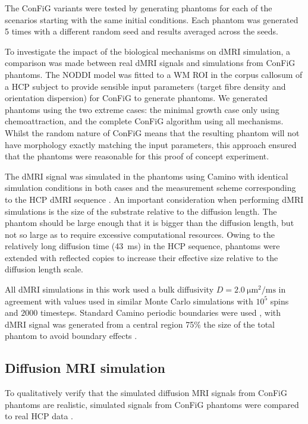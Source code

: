 The \ac{ConFiG} variants were tested by generating phantoms for each of the scenarios starting with the same initial conditions. Each phantom was generated 5 times with a different random seed and results averaged across the seeds.

To investigate the impact of the biological mechanisms on \ac{dMRI} simulation, a comparison was made between real \ac{dMRI} signals and simulations from \ac{ConFiG} phantoms. The \acs{NODDI} model \cite{Zhang2012} was fitted to a \ac{WM} ROI in the corpus callosum of a \ac{HCP} \cite{VanEssen2012} subject to provide sensible input parameters (target fibre density and orientation dispersion) for \ac{ConFiG} to generate phantoms. We generated phantoms using the two extreme cases: the minimal growth case only using chemoattraction, and the complete \ac{ConFiG} algorithm using all mechanisms. Whilst the random nature of \ac{ConFiG} means that the resulting phantom will not have morphology exactly matching the input parameters, this approach ensured that the phantoms were reasonable for this proof of concept experiment.

The \ac{dMRI} signal was simulated in the phantoms using Camino \cite{Cook2006,Hall2009} with identical simulation conditions in both cases and the measurement scheme corresponding to the \ac{HCP} \ac{dMRI} sequence \cite{Sotiropoulos2013a}. An important consideration when performing \ac{dMRI} simulations is the size of the substrate relative to the diffusion length. The phantom should be large enough that it is bigger than the diffusion length, but not so large as to require excessive computational resources. Owing to the relatively long diffusion time (\SI{43}{\milli\second}) in the \ac{HCP} sequence, phantoms were extended with reflected copies \cite{Lee2019a,Fieremans2018} to increase their effective size relative to the diffusion length scale.

All \ac{dMRI} simulations in this work used a bulk diffusivity $D=\SI{2.0}{\micro\metre\squared\per\milli\second}$ in agreement with values used in similar Monte Carlo simulations \cite{Hall2009,Nilsson2009,Rensonnet2017} with $10^5$ spins and $2000$ timesteps. Standard Camino periodic boundaries were used \cite{Hall2009}, with \ac{dMRI} signal was generated from a central region 75\% the size of the total phantom to avoid boundary effects \cite{Panagiotaki2010}.


\subsection{Diffusion \acs{MRI} simulation}
\label{sec:config_diffusion_sim}
To qualitatively verify that the simulated diffusion \ac{MRI} signals from \ac{ConFiG} phantoms are realistic, simulated signals from \ac{ConFiG} phantoms were compared to real \ac{HCP} data \cite{Sotiropoulos2013a,VanEssen2012}.

